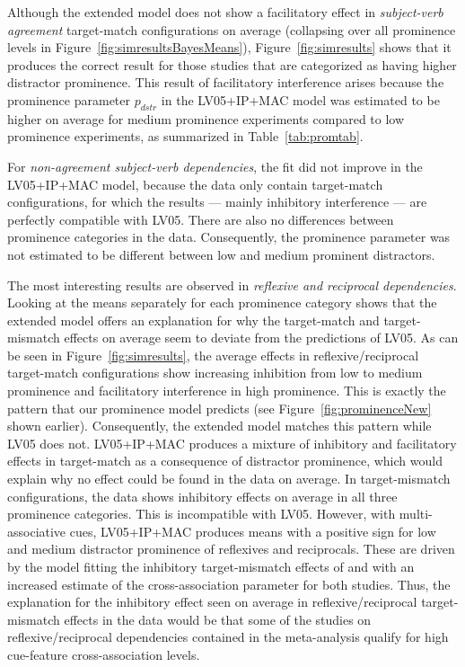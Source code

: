 \documentclass{cambridge7A}\usepackage[]{graphicx}\usepackage[]{color}
\begin{document}
Although the extended model does not show a facilitatory effect in  \emph{subject-verb agreement} target-match configurations on average (collapsing over all prominence levels in Figure~\ref{fig:simresultsBayesMeans}), Figure~\ref{fig:simresults} shows that it produces the correct result for those studies that are categorized as having higher distractor prominence.
This result of facilitatory interference arises because the prominence parameter $p_{dstr}$ in the LV05+IP+MAC model was estimated to be higher on average for medium prominence experiments compared to low prominence experiments, as summarized in Table~\ref{tab:promtab}. 

For \emph{non-agreement subject-verb dependencies}, the fit did not improve in the LV05+IP+MAC model, because the data only contain target-match configurations, for which the results --- mainly inhibitory interference --- are perfectly compatible with LV05. There are also no differences between prominence categories in the data. Consequently, the prominence parameter was not estimated to be different between low and medium prominent distractors.

The most interesting results are observed in  \emph{reflexive and reciprocal dependencies}. 
Looking at the means separately for each prominence category shows that the extended model offers an explanation for why the target-match and target-mismatch effects on average seem to deviate from the predictions of LV05.
As can be seen in Figure~\ref{fig:simresults}, the average effects in reflexive/reciprocal target-match configurations show increasing inhibition from low to medium prominence and facilitatory interference in high prominence. This is exactly the pattern that our prominence model predicts (see Figure~\ref{fig:prominenceNew} shown earlier). Consequently, the extended model matches this pattern while LV05 does not.
LV05+IP+MAC produces a mixture of inhibitory and facilitatory effects in target-match as a consequence of distractor prominence, which would explain why no effect could be found in the data on average.
In target-mismatch configurations, the data shows inhibitory effects on average in all three prominence categories. This is incompatible with LV05. 
However, with multi-associative cues, LV05+IP+MAC produces means with a positive sign for low and medium distractor prominence of reflexives and reciprocals. These are driven by the model fitting the inhibitory target-mismatch effects of \cite{KushPhillips2014} and \cite{JaegerEngelmannVasishth2015} with an increased estimate of the cross-association parameter for both studies. 
Thus, the explanation for the inhibitory effect seen on average in reflexive/reciprocal target-mismatch effects in the data would be that some of the studies on reflexive/reciprocal dependencies contained in the meta-analysis qualify for high cue-feature cross-association levels.
\end{document}
